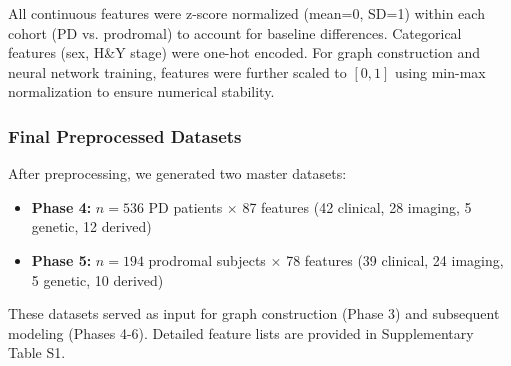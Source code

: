All continuous features were z-score normalized (mean=0, SD=1) within each cohort (PD vs. prodromal) to account for baseline differences. Categorical features (sex, H\&Y stage) were one-hot encoded. For graph construction and neural network training, features were further scaled to $[0, 1]$ using min-max normalization to ensure numerical stability.

\subsubsection{Final Preprocessed Datasets}

After preprocessing, we generated two master datasets:

\begin{itemize}
    \item \textbf{Phase 4:} $n=536$ PD patients $\times$ 87 features (42 clinical, 28 imaging, 5 genetic, 12 derived)
    \item \textbf{Phase 5:} $n=194$ prodromal subjects $\times$ 78 features (39 clinical, 24 imaging, 5 genetic, 10 derived)
\end{itemize}

These datasets served as input for graph construction (Phase 3) and subsequent modeling (Phases 4-6). Detailed feature lists are provided in Supplementary Table S1.
